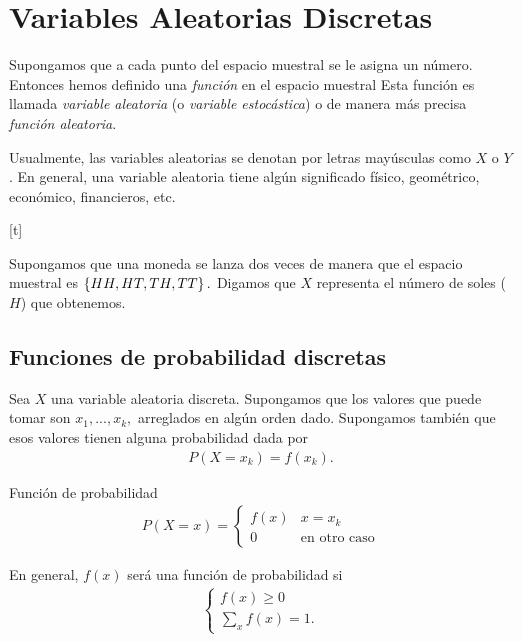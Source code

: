 \chapter{Variables Aleatorias Discretas}


Supongamos que a cada punto del espacio muestral se le asigna un número.  Entonces hemos definido una \emph{función} en el espacio muestral  Esta función es llamada \emph{variable aleatoria} (o \emph{variable estocástica}) o de manera más precisa \emph{función aleatoria}. 


Usualmente, las variables aleatorias se denotan por letras mayúsculas como $X$ o $Y$. En general, una variable aleatoria tiene algún significado físico, geométrico, económico, financieros, etc.


[t]
\begin{ejemplo}
  \label{exmp:2.1}
Supongamos que una moneda se lanza dos veces de manera que el espacio muestral es $\left\{ HH,HT,TH,TT \right\}.$  Digamos que $X$ representa el número de soles ($H$) que obtenemos.
\end{ejemplo}


\section{Funciones de probabilidad discretas}

 Sea $X$ una variable aleatoria discreta.  Supongamos que los valores que puede tomar son $x_{1},...,x_{k},$ arreglados en algún orden dado.  Supongamos también que esos valores
 tienen alguna probabilidad dada por
 \begin{align}
 \label{2.1}
 	P(X=x_{k})=f(x_{k}).
 \end{align}


{Función de probabilidad}
\begin{align}
\label{2.2}
P(X=x)=
\begin{cases}
f(x) & x=x_{k} \\
0	& \text{en otro caso}
\end{cases}
\end{align}



	En general, $f(x)$ será una función de probabilidad si
	\begin{align*}
		\begin{cases}
			f(x)\geq 0 \\
			\sum_{x}f(x)=1.
		\end{cases}
	\end{align*}



